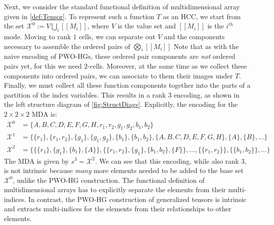 \documentclass{article}
\theoremstyle{plain}
\theoremstyle{definition}
\theoremstyle{remark}
\newcommand{\cX}{\mathcal{X}}
\begin{document}
Next, we consider the standard functional definition of multidimensional array given in \cref{def:Tensor}. To represent such a function $T$ as an HCC, we start from the set $\cX^0 := V \bigcup_i [[M_i]]$, where $V$ is the value set and $[[M_i]]$ is the $i^{th}$ mode. Moving to rank $1$ cells, we can separate out $V$ and the components necessary to assemble the ordered pairs of $\bigotimes_i [[M_i]]$ Note that as with the naive encoding of PWO-HGs, these ordered pair components are \textit{not} ordered pairs yet, for this we need $2$-cells. Moreover, at the same time as we collect these components into ordered pairs, we can associate to them their images under $T$. Finally, we must collect all these function components together into the parts of a partition of the index variables. This results in a rank $3$ encoding, as shown in the left structure diagram of \cref{fig:StructDiags}. Explicitly, the encoding for the $2 \times 2 \times 2$ MDA is:
\begin{equation*}
	\begin{aligned}
		\cX^0 &= \{ A, B, C, D, E, F, G, H, r_1, r_2, g_1, g_2, b_1, b_2\}\\
		\cX^1 &= \big\{ \{r_1\}, \{r_1, r_2\}, \{g_1\}, \{g_1, g_2\}, \{b_1\}, \{b_1, b_2\}, \{ A, B, C, D, E, F, G, H \}, \{A\}, \{B\}, ... \big\}\\
		\cX^2 &= \Big\{ \big\{ \{r_1\}, \{g_1\}, \{b_1\}, \{A\} \big\}, \big\{ \{r_1, r_2\}, \{g_1\}, \{b_1, b_2\}, \{F\} \big\}, ..., \big\{\{r_1, r_2\} \big\}, \big\{\{b_1, b_2\} \big\}, ... \Big\}
	\end{aligned}
\end{equation*}
The MDA is given by $s^3 = \cX^2$. We can see that this encoding, while also rank $3$, is not intrinsic because \textit{many} more elements needed to be added to the base set $\cX^0$, unlike the PWO-HG construction. The functional definition of multidimensional arrays has to explicitly separate the elements from their multi-indices. In contrast, the PWO-HG construction of generalized tensors is intrinsic and extracts multi-indices for the elements from their relationships to other elements.
\end{document}
